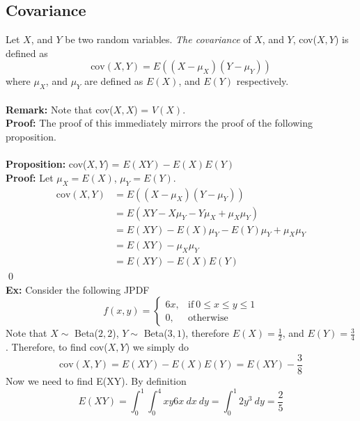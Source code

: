 \documentclass{article}
\newcommand{\ti}[1]{\textit{#1}}
\newcommand{\tb}[1]{\textbf{#1}}
\newcommand{\prop}{\textbf{Proposition: }}
\newcommand{\proo}{\textbf{Proof: }}
\newcommand{\exx}{\textbf{Ex: }}
\begin{document}
\subsection{Covariance}
Let $X$, and $Y$ be two random variables. \ti{The covariance} of $X$, and $Y$, cov($X, Y$) is defined as
\[\text{cov}(X, Y) = E((X-\mu_{X})(Y-\mu_{Y}))\]
where $\mu_{X}$, and $\mu_{Y}$ are defined as $E(X)$, and $E(Y)$ respectively.\\\\
\tb{Remark:} Note that cov($X, X$) = $V(X)$.\\
\proo The proof of this immediately mirrors the proof of the following proposition.\\\\
\prop cov($X, Y$) = $E(XY) - E(X)E(Y)$\\
\proo Let $\mu_{X} = E(X)$, $\mu_{Y} = E(Y)$.
\begin{align*}
	\text{cov}(X, Y) &= E((X-\mu_{X})(Y-\mu_{Y}))\\
				&= E(XY - X\mu_{Y} - Y\mu_{X} + \mu_{X}\mu_{Y})\\
				&= E(XY) - E(X)\mu_{Y} - E(Y)\mu_{Y} + \mu_{X}\mu_{Y}\\
				&= E(XY) - \mu_{X}\mu_{Y} \\
				&= E(XY) - E(X)E(Y)
\end{align*}
\qed\\
\exx Consider the following JPDF
\[
f(x, y) =
\begin{cases}
	6x, &\text{if}\ 0 \leq x \leq y \leq 1\\
	0, &\text{otherwise}
\end{cases}
\]
Note that $X \sim$ Beta($2, 2$), $Y \sim$ Beta($3, 1$), therefore $E(X) = \frac{1}{2}$, and $E(Y) = \frac{3}{4}$.  Therefore, to find cov($X, Y$) we simply do
\[\text{cov}(X, Y) = E(XY) - E(X)E(Y) = E(XY) - \frac{3}{8}\]
Now we need to find E(XY). By definition
\[E(XY) = \int_{0}^{1} \int_{0}^{4} xy6x\ dx\ dy = \int_{0}^{1} 2y^{3}\ dy = \frac{2}{5}\]
\end{document}
